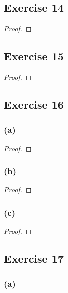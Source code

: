 \documentclass[14pt]{extarticle}
\begin{document}
\subsection{Exercise 14}

\begin{proof}

\end{proof}

\subsection{Exercise 15}

\begin{proof}

\end{proof}

\subsection{Exercise 16}

\subsubsection{(a)}

\begin{proof}

\end{proof}

\subsubsection{(b)}

\begin{proof}

\end{proof}

\subsubsection{(c)}

\begin{proof}

\end{proof}

\subsection{Exercise 17}

\subsubsection{(a)}
\end{document}
